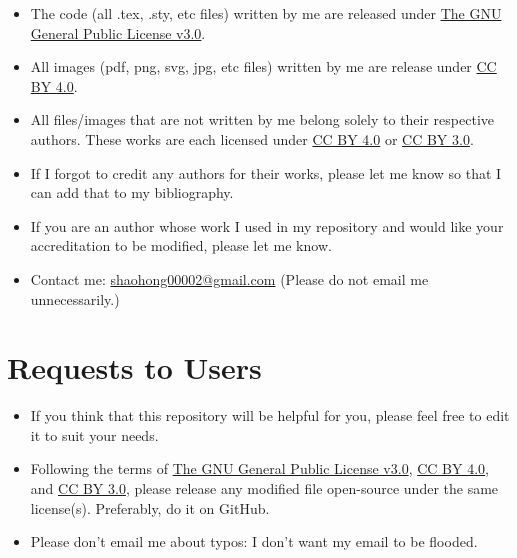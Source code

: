 \begin{itemize}
\item The code (all .tex, .sty, etc files) written by me are released under \href{https://github.com/GrassGlass/A-Levels/blob/main/LICENSE}{The GNU General Public License v3.0}.
\item All images (pdf, png, svg, jpg, etc files) written by me are release under \href{https://creativecommons.org/licenses/by/4.0/}{CC BY 4.0}.
\item All files/images that are not written by me belong solely to their respective authors. These works are each licensed under \href{https://creativecommons.org/licenses/by/4.0/}{CC BY 4.0} or \href{https://creativecommons.org/licenses/by/3.0/}{CC BY 3.0}.
\item If I forgot to credit any authors for their works, please let me know so that I can add that to my bibliography.
\item If you are an author whose work I used in my repository and would like your accreditation to be modified, please let me know.
\item Contact me: \href{mailto:shaohong00002@gmail.com}{shaohong00002@gmail.com} (Please do not email me unnecessarily.)
\end{itemize}
\section*{Requests to Users}
\begin{itemize}
\item If you think that this repository will be helpful for you, please feel free to edit it to suit your needs.
\item Following the terms of \href{https://github.com/GrassGlass/A-Levels/blob/main/LICENSE}{The GNU General Public License v3.0}, \href{https://creativecommons.org/licenses/by/4.0/}{CC BY 4.0}, and \href{https://creativecommons.org/licenses/by/3.0/}{CC BY 3.0}, please release any modified file open-source under the same license(s). Preferably, do it on GitHub.
\item Please don't email me about typos: I don't want my email to be flooded.
\end{itemize}